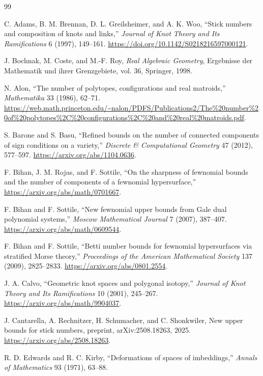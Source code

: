 \documentclass[11pt]{article}
\theoremstyle{remark}
\theoremstyle{plain}
\begin{document}
\begin{thebibliography}{99}

C. Adams, B. M. Brennan, D. L. Greilsheimer, and A. K. Woo,
``Stick numbers and composition of knots and links,''
\emph{Journal of Knot Theory and Its Ramifications} 6 (1997), 149--161.
\url{https://doi.org/10.1142/S0218216597000121}.

J. Bochnak, M. Coste, and M.-F. Roy,
\emph{Real Algebraic Geometry},
Ergebnisse der Mathematik und ihrer Grenzgebiete, vol. 36,
Springer, 1998.

N. Alon,
``The number of polytopes, configurations and real matroids,''
\emph{Mathematika} 33 (1986), 62--71.
\url{https://web.math.princeton.edu/~nalon/PDFS/Publications2/The%20number%20of%20polytopes%2C%20configurations%2C%20and%20real%20matroids.pdf}.

S. Barone and S. Basu,
``Refined bounds on the number of connected components of sign conditions on a variety,''
\emph{Discrete \& Computational Geometry} 47 (2012), 577--597.
\url{https://arxiv.org/abs/1104.0636}.

F. Bihan, J. M. Rojas, and F. Sottile,
``On the sharpness of fewnomial bounds and the number of components of a fewnomial hypersurface,''
\url{https://arxiv.org/abs/math/0701667}.

F. Bihan and F. Sottile,
``New fewnomial upper bounds from Gale dual polynomial systems,''
\emph{Moscow Mathematical Journal} 7 (2007), 387--407.
\url{https://arxiv.org/abs/math/0609544}.

F. Bihan and F. Sottile,
``Betti number bounds for fewnomial hypersurfaces via stratified Morse theory,''
\emph{Proceedings of the American Mathematical Society} 137 (2009), 2825--2833.
\url{https://arxiv.org/abs/0801.2554}.

J. A. Calvo,
``Geometric knot spaces and polygonal isotopy,''
\emph{Journal of Knot Theory and Its Ramifications} 10 (2001), 245--267.
\url{https://arxiv.org/abs/math/9904037}.

J. Cantarella, A. Rechnitzer, H. Schumacher, and C. Shonkwiler,
New upper bounds for stick numbers,
preprint, arXiv:2508.18263, 2025.
\url{https://arxiv.org/abs/2508.18263}.

R. D. Edwards and R. C. Kirby,
``Deformations of spaces of imbeddings,''
\emph{Annals of Mathematics} 93 (1971), 63--88.


\end{thebibliography}
\end{document}
